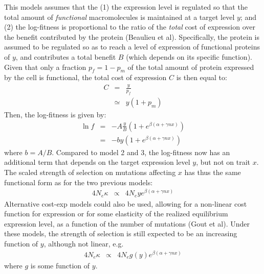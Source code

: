 \documentclass{article}
\begin{document}
This models assumes that the (1) the expression level is regulated so that the total amount of \emph{functional} macromolecules is maintained at a target level $y$; and (2) the log-fitness is proportional to the ratio of the \emph{total} cost of expression over the benefit contributed by the protein (Beaulieu et al). Specifically, the protein is assumed to be regulated so as to reach a level of expression of functional proteins of $y$, and contributes a total benefit $B$ (which depends on its specific function). Given that only a fraction $p_f = 1-p_m$ of the total amount of protein expressed by the cell is functional, the total cost of expression $C$ is then equal to:
\begin{eqnarray}
C &=& \frac{y}{p_f}
\\ &\simeq& y (1 + p_m)
\end{eqnarray}
Then, the log-fitness is given by:
\begin{eqnarray}
\ln f & = & -A \frac{y}{B} \left( 1 + e^{\beta(\alpha + \gamma n x)} \right)
\\
&=& -by (1 + e^{\beta(\alpha + \gamma n x)})
\end{eqnarray}
where $b = A /B$. Compared to model 2 and 3, the log-fitness now has an additional term that depends on the target expression level $y$, but not on trait $x$. The scaled strength of selection on mutations affecting $x$ has thus the same functional form as for the two previous models:
\begin{eqnarray}
4 N_e \kappa &\propto& 4 N_e y e^{\beta(\alpha + \gamma n x)}
\end{eqnarray}
Alternative cost-exp models could also be used, allowing for a non-linear cost function for expression or for some elasticity of the realized equilibrium expression level, as a function of the number of mutations (Gout et al). Under these models, the strength of selection is still expected to be an increasing function of $y$, although not linear, e.g.
\begin{eqnarray}
4 N_e \kappa &\propto& 4 N_e g(y) e^{\beta(\alpha + \gamma n x)}
\end{eqnarray}
where $g$ is some function of $y$.




\end{document}
